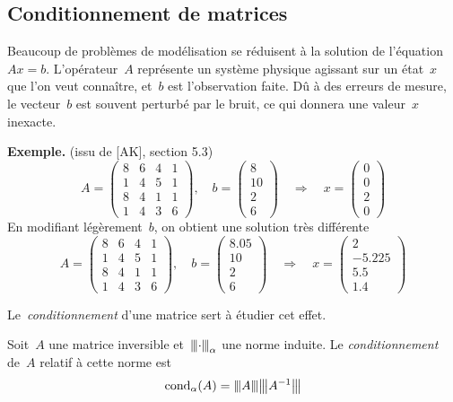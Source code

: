\subsection{Conditionnement de matrices}

Beaucoup de problèmes de modélisation se réduisent à la solution de
l'équation~$Ax=b$.  L'opérateur~$A$ représente un système physique agissant
sur un état~$x$ que l'on veut connaître, et~$b$ est l'observation faite.
Dû à des erreurs de mesure, le vecteur~$b$ est souvent perturbé par le bruit,
ce qui donnera une valeur~$x$ inexacte.

{\bf Exemple.} (issu de [AK], section 5.3)
\[
A = \left(\begin{array}{cccc}
8 & 6 & 4 & 1 \\
1 & 4 & 5 & 1 \\
8 & 4 & 1 & 1 \\
1 & 4 & 3 & 6
\end{array}\right), \quad b =  \begin{pmatrix}8 \\ 10 \\ 2 \\ 6\end{pmatrix} \quad
\Rightarrow \quad
x = \begin{pmatrix}0 \\ 0 \\ 2 \\ 0\end{pmatrix}
\]
En modifiant légèrement~$b$, on obtient une solution très différente
\[
A = \left(\begin{array}{cccc}
8 & 6 & 4 & 1 \\
1 & 4 & 5 & 1 \\
8 & 4 & 1 & 1 \\
1 & 4 & 3 & 6
\end{array}\right), \quad b = \begin{pmatrix}8.05 \\ 10 \\ 2 \\ 6\end{pmatrix} \quad
\Rightarrow \quad x = \begin{pmatrix}2 \\ -5.225 \\ 5.5 \\ 1.4\end{pmatrix}
\]

Le~\emph{conditionnement} d'une matrice sert à étudier cet effet.

\begin{definition}
	Soit~$A$ une matrice inversible et~${\left\vert\kern-0.25ex\left\vert\kern-0.25ex\left\vert \cdot \right\vert\kern-0.25ex\right\vert\kern-0.25ex\right\vert}_\alpha$ une norme induite.  Le
	\emph{conditionnement} de~$A$ relatif à cette norme est
	\[
		\mathrm{cond}_\alpha(A) = {\left\vert\kern-0.25ex\left\vert\kern-0.25ex\left\vert A \right\vert\kern-0.25ex\right\vert\kern-0.25ex\right\vert}{\left\vert\kern-0.25ex\left\vert\kern-0.25ex\left\vert A^{-1} \right\vert\kern-0.25ex\right\vert\kern-0.25ex\right\vert}
	\]
\end{definition}

